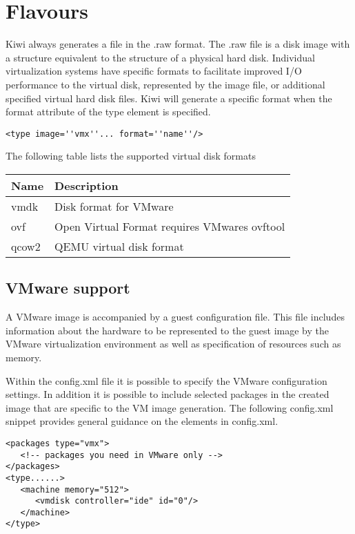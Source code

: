 \section{Flavours}

Kiwi always generates a file in the .raw format. The .raw file is a disk
image with a structure equivalent to the structure of a physical hard disk. 
Individual virtualization systems have specific formats to facilitate
improved I/O performance to the virtual disk, represented by the image file,
or additional specified virtual hard disk files. Kiwi will generate a 
specific format when the format attribute of the type element is specified.


\begin{Command}{12cm}
\begin{verbatim}
<type image=''vmx''... format=''name''/>
\end{verbatim}
\end{Command}

The following table lists the supported virtual disk formats

\begin{tabular}[h]{|p{2cm}|p{9cm}|}
\hline
\textbf{Name} & \textbf{Description} \\
\hline
vmdk        & Disk format for VMware \\
ovf         & Open Virtual Format requires VMwares ovftool \\
qcow2       & QEMU virtual disk format  \\
\hline
\end{tabular}

\subsection{VMware support}

A VMware image is accompanied by a guest configuration file. This file 
includes information about the hardware to be represented to the guest 
image by the VMware virtualization environment as well as specification
of resources such as memory. 

Within the config.xml file it is possible to specify the VMware configuration
settings. In addition it is possible to include selected packages in the 
created image that are specific to the VM image generation. The following
config.xml snippet provides general guidance on the elements in config.xml.

\begin{Command}{13cm}
\begin{verbatim}
<packages type="vmx">
   <!-- packages you need in VMware only -->
</packages>
<type......>
   <machine memory="512">
      <vmdisk controller="ide" id="0"/>
   </machine>
</type>
\end{verbatim}
\end{Command}

